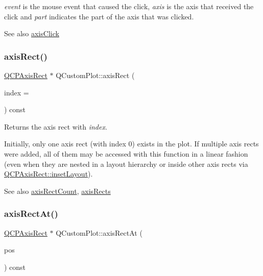 {\itshape event} is the mouse event that caused the click, {\itshape axis} is the axis that received the click and {\itshape part} indicates the part of the axis that was clicked.

\begin{DoxySeeAlso}{See also}
\hyperlink{class_q_custom_plot_abf635f8b56ab5c16d5de9f358543e82b}{axis\+Click} 
\end{DoxySeeAlso}
\mbox{\label{class_q_custom_plot_ae5eefcb5f6ca26689b1fd4f6e25b42f9}} 
\subsubsection{\texorpdfstring{axis\+Rect()}{axisRect()}}
{\footnotesize\ttfamily \hyperlink{class_q_c_p_axis_rect}{Q\+C\+P\+Axis\+Rect} $\ast$ Q\+Custom\+Plot\+::axis\+Rect (\begin{DoxyParamCaption}\item[{int}]{index = {} }\end{DoxyParamCaption}) const}

Returns the axis rect with {\itshape index}.

Initially, only one axis rect (with index 0) exists in the plot. If multiple axis rects were added, all of them may be accessed with this function in a linear fashion (even when they are nested in a layout hierarchy or inside other axis rects via \hyperlink{class_q_c_p_axis_rect_a949f803466619924c7018df4b511ae10}{Q\+C\+P\+Axis\+Rect\+::inset\+Layout}).

\begin{DoxySeeAlso}{See also}
\hyperlink{class_q_custom_plot_a8f85940aaac50efb466287d9d2d04ec6}{axis\+Rect\+Count}, \hyperlink{class_q_custom_plot_a12af771429e2d7e313c8c5d5fca068fe}{axis\+Rects} 
\end{DoxySeeAlso}
\mbox{\label{class_q_custom_plot_a4a08842fc3e9ba6bed83aa410c5c5ba5}} 
\subsubsection{\texorpdfstring{axis\+Rect\+At()}{axisRectAt()}}
{\footnotesize\ttfamily \hyperlink{class_q_c_p_axis_rect}{Q\+C\+P\+Axis\+Rect} $\ast$ Q\+Custom\+Plot\+::axis\+Rect\+At (\begin{DoxyParamCaption}\item[{const Q\+PointF \&}]{pos }\end{DoxyParamCaption}) const}

